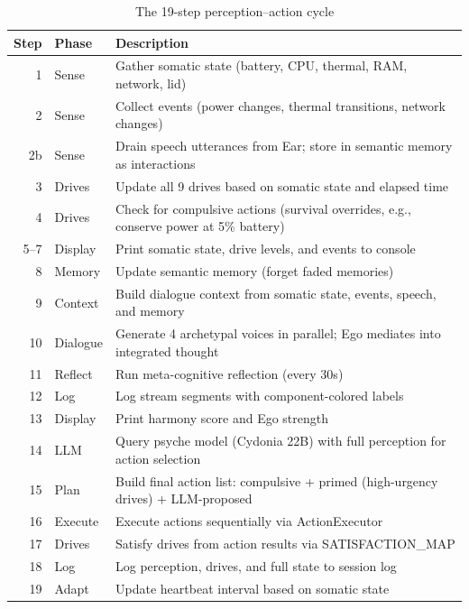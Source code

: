 \documentclass[11pt,oneside]{article}
\begin{document}
\begin{table}[H]
\centering
\caption{The 19-step perception--action cycle}
\label{alg:cycle}
\small
\begin{tabularx}{\textwidth}{r l X}
\toprule
\textbf{Step} & \textbf{Phase} & \textbf{Description} \\
\midrule
1  & Sense    & Gather somatic state (battery, CPU, thermal, RAM, network, lid) \\
2  & Sense    & Collect events (power changes, thermal transitions, network changes) \\
2b & Sense    & Drain speech utterances from Ear; store in semantic memory as interactions \\
3  & Drives   & Update all 9 drives based on somatic state and elapsed time \\
4  & Drives   & Check for compulsive actions (survival overrides, e.g., conserve power at 5\% battery) \\
5--7 & Display & Print somatic state, drive levels, and events to console \\
8  & Memory   & Update semantic memory (forget faded memories) \\
9  & Context  & Build dialogue context from somatic state, events, speech, and memory \\
10 & Dialogue & Generate 4 archetypal voices in parallel; Ego mediates into integrated thought \\
11 & Reflect  & Run meta-cognitive reflection (every 30s) \\
12 & Log      & Log stream segments with component-colored labels \\
13 & Display  & Print harmony score and Ego strength \\
14 & LLM      & Query psyche model (Cydonia 22B) with full perception for action selection \\
15 & Plan     & Build final action list: compulsive + primed (high-urgency drives) + LLM-proposed \\
16 & Execute  & Execute actions sequentially via ActionExecutor \\
17 & Drives   & Satisfy drives from action results via SATISFACTION\_MAP \\
18 & Log      & Log perception, drives, and full state to session log \\
19 & Adapt    & Update heartbeat interval based on somatic state \\
\bottomrule
\end{tabularx}
\end{table}
\end{document}
